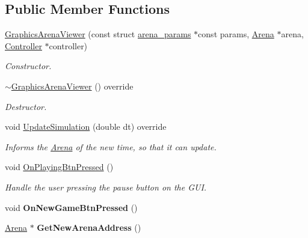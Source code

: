 \subsection*{Public Member Functions}
\begin{DoxyCompactItemize}
\item 
\hyperlink{classGraphicsArenaViewer_a869510833897508300da65b1eb0c5d09}{Graphics\+Arena\+Viewer} (const struct \hyperlink{structarena__params}{arena\+\_\+params} $\ast$const params, \hyperlink{classArena}{Arena} $\ast$arena, \hyperlink{classController}{Controller} $\ast$controller)
\begin{DoxyCompactList}\small\item\em Constructor. \end{DoxyCompactList}\item 
\hyperlink{classGraphicsArenaViewer_a88cea02aab1550a7f315fbf4f3868109}{$\sim$\+Graphics\+Arena\+Viewer} () override
\begin{DoxyCompactList}\small\item\em Destructor. \end{DoxyCompactList}\item 
void \hyperlink{classGraphicsArenaViewer_aeec66666382aa0312574d70aa58de250}{Update\+Simulation} (double dt) override
\begin{DoxyCompactList}\small\item\em Informs the \hyperlink{classArena}{Arena} of the new time, so that it can update. \end{DoxyCompactList}\item 
void \hyperlink{classGraphicsArenaViewer_a7cc65fd0e2e8c1f6138608e398c7c887}{On\+Playing\+Btn\+Pressed} ()
\begin{DoxyCompactList}\small\item\em Handle the user pressing the pause button on the G\+UI. \end{DoxyCompactList}\item 
void {\bfseries On\+New\+Game\+Btn\+Pressed} ()\hypertarget{classGraphicsArenaViewer_a7a573f7f55d54fd066d3d47df7a6454b}{}\label{classGraphicsArenaViewer_a7a573f7f55d54fd066d3d47df7a6454b}

\item 
\hyperlink{classArena}{Arena} $\ast$ {\bfseries Get\+New\+Arena\+Address} ()\hypertarget{classGraphicsArenaViewer_add403850506359da3cf6155fc13b1744}{}\label{classGraphicsArenaViewer_add403850506359da3cf6155fc13b1744}


\end{DoxyCompactItemize}
